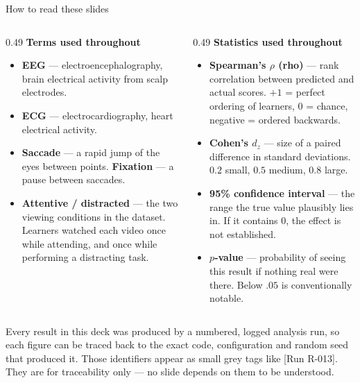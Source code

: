 \documentclass[aspectratio=169,10pt]{beamer}
\makeatletter
\newcommand{\runtag}[1]{{\scriptsize\color{mubeamer@gray7}[#1]}}
\newcommand{\sidenote}[1]{{\scriptsize\color{mubeamer@gray7}\sloppy\par#1\par}}
\makeatother
\begin{document}
\begin{frame}{How to read these slides}
  \small
  \begin{columns}[T]
    \begin{column}{0.49\textwidth}
      \textbf{Terms used throughout}
      \begin{itemize}\small
        \item \textbf{EEG} --- electroencephalography, brain electrical
          activity from scalp electrodes.
        \item \textbf{ECG} --- electrocardiography, heart electrical activity.
        \item \textbf{Saccade} --- a rapid jump of the eyes between points.
          \textbf{Fixation} --- a pause between saccades.
        \item \textbf{Attentive / distracted} --- the two viewing conditions
          in the dataset. Learners watched each video once while attending,
          and once while performing a distracting task.
      \end{itemize}
    \end{column}
    \begin{column}{0.49\textwidth}
      \textbf{Statistics used throughout}
      \begin{itemize}\small
        \item \textbf{Spearman's $\rho$ (rho)} --- rank correlation between
          predicted and actual scores. $+1$ = perfect ordering of learners,
          $0$ = chance, negative = ordered backwards.
        \item \textbf{Cohen's $d_z$} --- size of a paired difference in
          standard deviations. $0.2$ small, $0.5$ medium, $0.8$ large.
        \item \textbf{95\% confidence interval} --- the range the true value
          plausibly lies in. If it contains $0$, the effect is not established.
        \item \textbf{$p$-value} --- probability of seeing this result if
          nothing real were there. Below $.05$ is conventionally notable.
      \end{itemize}
    \end{column}
  \end{columns}

  \vspace{0.5em}
  \sidenote{Every result in this deck was produced by a numbered, logged
  analysis run, so each figure can be traced back to the exact code,
  configuration and random seed that produced it. Those identifiers appear as
  small grey tags like \runtag{Run R-013}. They are for traceability only --- no
  slide depends on them to be understood.}
\end{frame}
\end{document}
